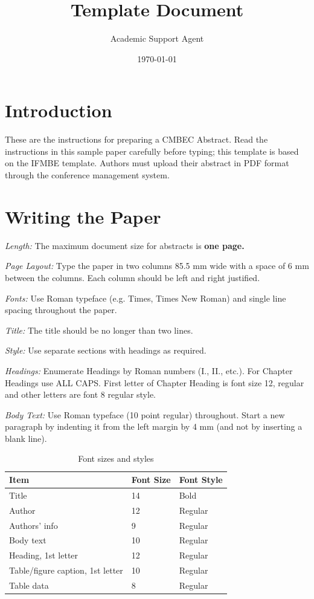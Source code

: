 \documentclass{article}
\title{Template Document}
\author{Academic Support Agent}
\date{\today}
\begin{document}
\maketitle

\maketitle


\section{Introduction}

These are the instructions for preparing a CMBEC Abstract. Read the instructions in this sample paper carefully before typing; this template is based on the IFMBE template. Authors must upload their abstract in PDF format through the conference management system.

\section{Writing the Paper}

\textit{Length:} The maximum document size for abstracts is \textbf{one page.} 

\textit{Page Layout:} Type the paper in two columns 85.5 mm wide with a space of 6 mm between the columns. Each column should be left and right justified.

\textit{Fonts:} Use Roman typeface (e.g. Times, Times New Roman) and single line spacing throughout the paper.

\textit{Title:} The title should be no longer than two lines. 

\textit{Style:} Use separate sections with headings as required. 

\textit{Headings:} Enumerate Headings by Roman numbers (I., II., etc.). For Chapter Headings use ALL CAPS. First letter of Chapter Heading is font size 12, regular and other letters are font 8 regular style. 

\textit{Body Text:} Use Roman typeface (10 point regular) throughout. Start a new paragraph by indenting it from the left margin by 4 mm (and not by inserting a blank line). 

\begin{table}[ht]
  \footnotesize %
  \caption{Font sizes and styles}
  \begin{tabular}{p{3.90cm}p{1.40cm}p{1.90cm}}
     \hline
     \normalfont Item & Font Size & Font Style \\
     \hline
     Title & 14 & Bold\\
     Author & 12 & Regular\\
     Authors' info & 9 & Regular\\
     Body text & 10 & Regular\\
     Heading, 1st letter & 12 & Regular\\
     Table/figure caption, 1st letter & 10 & Regular\\
     Table data & 8 & Regular\\
     \hline
  \end{tabular}
  \label{table1}
\end{table}
\end{document}
